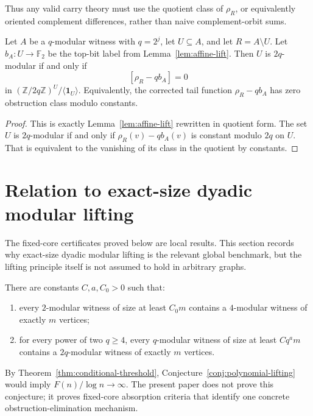 \documentclass[thmsec,dntnbr,nolinenbrs]{dmgt}
\numberwithin{equation}{section}
\newcommand{\F}{\mathbb{F}}
\newcommand{\Z}{\mathbb{Z}}
\newcommand{\one}{\mathbf{1}}
\begin{document}
Thus any valid carry theory must use the quotient class of \(\rho_R\), or equivalently oriented complement differences, rather than naive complement-orbit sums.

\begin{corollary}\label{cor:affine-obstruction}
Let \(A\) be a \(q\)-modular witness with \(q=2^j\), let \(U\subseteq A\), and let \(R=A\setminus U\).  Let \(b_A:U\to \F_2\) be the top-bit label from Lemma~\ref{lem:affine-lift}.  Then \(U\) is \(2q\)-modular if and only if
\[
        [\rho_R-qb_A]=0
\]
in \((\Z/2q\Z)^U/\langle \one_U\rangle\).  Equivalently, the corrected tail function \(\rho_R-qb_A\) has zero obstruction class modulo constants.
\end{corollary}

\begin{proof}
This is exactly Lemma~\ref{lem:affine-lift} rewritten in quotient form.  The set \(U\) is \(2q\)-modular if and only if \(\rho_R(v)-qb_A(v)\) is constant modulo \(2q\) on \(U\).  That is equivalent to the vanishing of its class in the quotient by constants.
\end{proof}

\section{Relation to exact-size dyadic modular lifting}

The fixed-core certificates proved below are local results.  This section records why exact-size dyadic modular lifting is the relevant global benchmark, but the lifting principle itself is not assumed to hold in arbitrary graphs.

\begin{conjecture}\label{conj:polynomial-lifting}
There are constants \(C,a,C_0>0\) such that:
\begin{enumerate}[label=\textup{(\arabic*)}, leftmargin=*]
    \item every \(2\)-modular witness of size at least \(C_0m\) contains a \(4\)-modular witness of exactly \(m\) vertices;
    \item for every power of two \(q\ge 4\), every \(q\)-modular witness of size at least \(Cq^a m\) contains a \(2q\)-modular witness of exactly \(m\) vertices.
\end{enumerate}
\end{conjecture}

By Theorem~\ref{thm:conditional-threshold}, Conjecture~\ref{conj:polynomial-lifting} would imply \(F(n)/\log n\to\infty\).  The present paper does not prove this conjecture; it proves fixed-core absorption criteria that identify one concrete obstruction-elimination mechanism.
\end{document}
